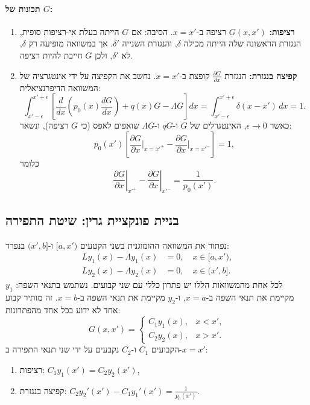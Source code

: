 \paragraph{תכונות של \(G\):}
\begin{enumerate}
\item \textbf{רציפות:} \(G(x, x')\) רציפה ב-\(x = x'\). הסיבה: אם \(G\) הייתה בעלת אי-רציפות סופית, הנגזרת הראשונה שלה הייתה מכילה \(\delta\), והנגזרת השנייה \(\delta'\). אך במשוואה מופיעה רק \(\delta\), לא \(\delta'\), ולכן \(G\) חייבת להיות רציפה.

\item \textbf{קפיצה בנגזרת:} הנגזרת \(\frac{\partial G}{\partial x}\) קופצת ב-\(x = x'\). נחשב את הקפיצה על ידי אינטגרציה של המשוואה הדיפרנציאלית:
\[
\int_{x' - \epsilon}^{x' + \epsilon} \left[ \frac{d}{dx}\left( p_0(x) \frac{dG}{dx} \right) + q(x) G - \Lambda G \right] dx = \int_{x' - \epsilon}^{x' + \epsilon} \delta(x - x') \, dx = 1.
\]
כאשר \(\epsilon \to 0\), האינטגרלים של \(G\) ו-\(q G\) ו-\(\Lambda G\) שואפים לאפס (כי \(G\) רציפה), ונשאר:
\[
p_0(x') \left[ \frac{\partial G}{\partial x}\bigg|_{x = x'^+} - \frac{\partial G}{\partial x}\bigg|_{x = x'^-} \right] = 1,
\]
כלומר
\[
\left. \frac{\partial G}{\partial x} \right|_{x'^+} - \left. \frac{\partial G}{\partial x} \right|_{x'^-} = \frac{1}{p_0(x')}.
\]
\end{enumerate}

\subsection*{בניית פונקציית גרין: שיטת התפירה}

נפתור את המשוואה ההומוגנית בשני הקטעים \([a, x')\) ו-\((x', b]\) בנפרד:
\begin{align*}
L y_1(x) - \Lambda y_1(x) &= 0, \quad x \in [a, x'), \\
L y_2(x) - \Lambda y_2(x) &= 0, \quad x \in (x', b].
\end{align*}
לכל אחת מהמשוואות הללו יש פתרון כללי עם שני קבועים. נשתמש בתנאי השפה: \(y_1\) מקיימת את תנאי השפה ב-\(x = a\), ו-\(y_2\) מקיימת את תנאי השפה ב-\(x = b\). זה מותיר קבוע אחד לא ידוע בכל אחד מהפתרונות:
\[
G(x, x') = \begin{cases}
C_1 y_1(x), & x < x', \\
C_2 y_2(x), & x > x'.
\end{cases}
\]
הקבועים \(C_1\) ו-\(C_2\) נקבעים על ידי שני תנאי התפירה ב-\(x = x'\):
\begin{enumerate}
\item רציפות: \(C_1 y_1(x') = C_2 y_2(x')\),
\item קפיצה בנגזרת: \(C_2 y_2'(x') - C_1 y_1'(x') = \frac{1}{p_0(x')}\).
\end{enumerate}

